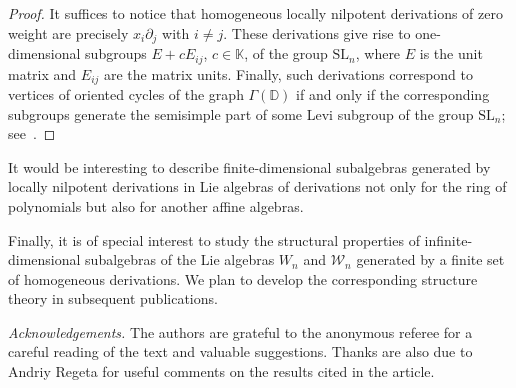 \documentclass[a4paper, 12pt,oneside,reqno]{amsart}
\numberwithin{equation}{section}
\theoremstyle{definition}
\begin{document}
{\begin{proof}
It suffices to notice that homogeneous locally nilpotent derivations of zero weight are precisely $x_i\partial_j$ with $i\ne j$. These derivations give rise to one-dimensional subgroups $E+cE_{ij}$, $c\in\mathbb{K}$, of the group $\text{SL}_n$, where $E$ is the unit matrix and $E_{ij}$ are the matrix units. Finally, such derivations correspond to vertices of oriented cycles of the graph $\Gamma(\mathbb{D})$  if and only if the corresponding subgroups generate the semisimple part of some Levi subgroup of the group $\text{SL}_n$;
see~\cite[Theorem~30.1]{Hum}. 
\end{proof}

It would be interesting to describe finite-dimensional subalgebras generated by locally nilpotent derivations in Lie algebras of derivations not only for the ring of polynomials but also for another affine algebras.

Finally, it is of special interest to study the structural properties of infinite-dimensional subalgebras of the Lie algebras $W_n$ and $\mathcal{W}_n$ generated by a finite set of homogeneous derivations. We plan to develop the corresponding structure theory in subsequent publications. 

\bigskip

\emph{Acknowledgements.} The authors are grateful to the anonymous referee for a careful reading of the text and valuable suggestions. Thanks are also due to Andriy Regeta for useful comments on the results cited in the article.

}
\end{document}
